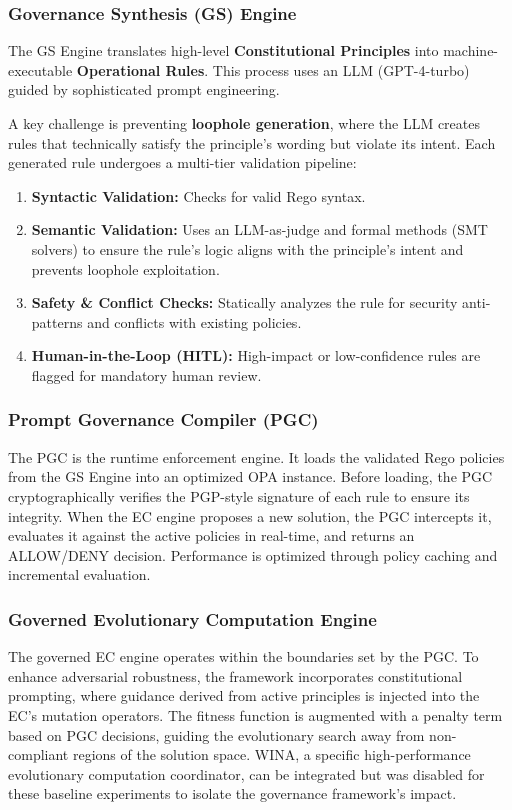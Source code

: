 \subsubsection{Governance Synthesis (GS) Engine}
The GS Engine translates high-level \textbf{Constitutional Principles} into machine-executable \textbf{Operational Rules}. This process uses an LLM (GPT-4-turbo) guided by sophisticated prompt engineering.

A key challenge is preventing \textbf{loophole generation}, where the LLM creates rules that technically satisfy the principle's wording but violate its intent. Each generated rule undergoes a multi-tier validation pipeline:

\begin{enumerate}[leftmargin=*,topsep=2pt,itemsep=1pt,parsep=0pt]
\item \textbf{Syntactic Validation:} Checks for valid Rego syntax.
\item \textbf{Semantic Validation:} Uses an LLM-as-judge and formal methods (SMT solvers) to ensure the rule's logic aligns with the principle's intent and prevents loophole exploitation.
\item \textbf{Safety \& Conflict Checks:} Statically analyzes the rule for security anti-patterns and conflicts with existing policies.
\item \textbf{Human-in-the-Loop (HITL):} High-impact or low-confidence rules are flagged for mandatory human review.
\end{enumerate}

\subsubsection{Prompt Governance Compiler (PGC)}
The PGC is the runtime enforcement engine. It loads the validated Rego policies from the GS Engine into an optimized OPA instance. Before loading, the PGC cryptographically verifies the PGP-style signature of each rule to ensure its integrity. When the EC engine proposes a new solution, the PGC intercepts it, evaluates it against the active policies in real-time, and returns an ALLOW/DENY decision. Performance is optimized through policy caching and incremental evaluation.

\subsubsection{Governed Evolutionary Computation Engine}
The governed EC engine operates within the boundaries set by the PGC\@. To enhance adversarial robustness, the framework incorporates constitutional prompting, where guidance derived from active principles is injected into the EC's mutation operators. The fitness function is augmented with a penalty term based on PGC decisions, guiding the evolutionary search away from non-compliant regions of the solution space. WINA, a specific high-performance evolutionary computation coordinator, can be integrated but was disabled for these baseline experiments to isolate the governance framework's impact.
